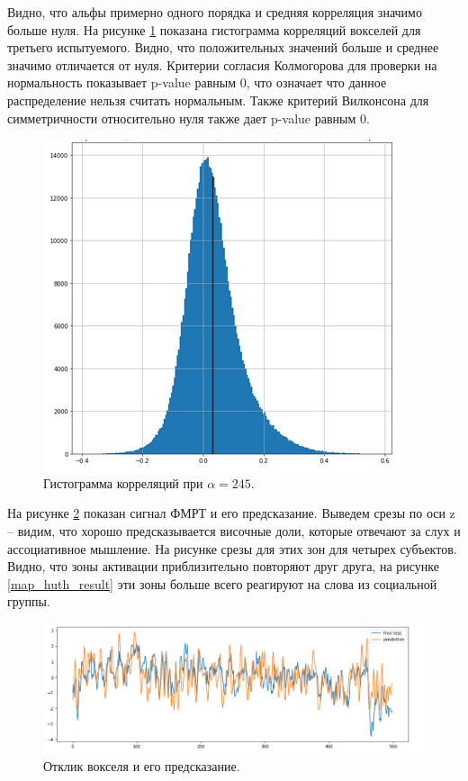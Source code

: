 \documentclass[pdftex,ptm,12pt,a4paper]{report}
\theoremstyle{definition}
\begin{document}
Видно, что альфы примерно одного порядка и средняя корреляция значимо больше нуля. На рисунке \ref{sub3_hist} показана гистограмма корреляций вокселей для третьего испытуемого. Видно, что положительных значений больше и среднее значимо отличается от нуля. Критерии согласия Колмогорова для проверки на нормальность показывает p-value равным 0, что означает что данное распределение нельзя считать нормальным. Также критерий Вилконсона для  симметричности относительно нуля также дает p-value равным 0.

\begin{figure}[h]
\includegraphics[scale=0.6]{graphics/sub3_prep2.png}
\centering
\caption{Гистограмма корреляций при $\alpha=245$.}
\label{sub3_hist}
\end{figure}

На рисунке \ref{sub3_bv} показан сигнал ФМРТ и его предсказание. Выведем срезы по оси z -- видим, что хорошо предсказывается височные доли, которые отвечают за слух и ассоциативное мышление. На рисунке срезы для этих зон для четырех субъектов. Видно, что зоны активации приблизительно повторяют друг друга, на рисунке \ref{map_huth_result} эти зоны больше всего реагируют на слова из социальной группы. 

\begin{figure}[h]
\includegraphics[scale=0.5]{graphics/sub3_prep2_bestvoxel.png}
\centering
\caption{Отклик вокселя и его предсказание.}
\label{sub3_bv}
\end{figure}
\end{document}
